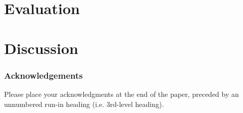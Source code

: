 \documentclass[runningheads]{llncs}
\begin{document}




\section{Evaluation}
\section{Discussion}



\subsubsection{Acknowledgements} Please place your acknowledgments at
the end of the paper, preceded by an unnumbered run-in heading (i.e.
3rd-level heading).

%
%
%


\end{document}
